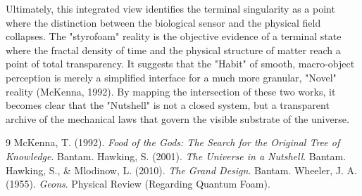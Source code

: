 \documentclass[12pt]{article}
\begin{document}
Ultimately, this integrated view identifies the terminal singularity as a point where the distinction between the biological sensor and the physical field collapses. The "styrofoam" reality is the objective evidence of a terminal state where the fractal density of time and the physical structure of matter reach a point of total transparency. It suggests that the "Habit" of smooth, macro-object perception is merely a simplified interface for a much more granular, "Novel" reality (McKenna, 1992). By mapping the intersection of these two works, it becomes clear that the "Nutshell" is not a closed system, but a transparent archive of the mechanical laws that govern the visible substrate of the universe.

\begin{thebibliography}{9}
 McKenna, T. (1992). \textit{Food of the Gods: The Search for the Original Tree of Knowledge}. Bantam.
 Hawking, S. (2001). \textit{The Universe in a Nutshell}. Bantam.
 Hawking, S., \& Mlodinow, L. (2010). \textit{The Grand Design}. Bantam.
 Wheeler, J. A. (1955). \textit{Geons}. Physical Review (Regarding Quantum Foam).
\end{thebibliography}
\end{document}
